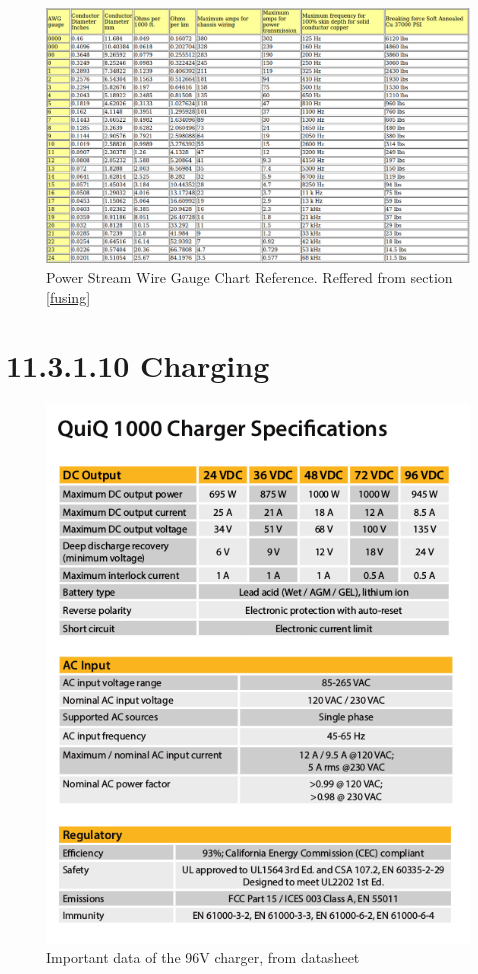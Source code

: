 \documentclass{article}
\begin{document}
\begin{figure}
    \centering
    \includegraphics[width = 1 \textwidth]{WireGaugeChart}
    \caption{Power Stream Wire Gauge Chart Reference. Reffered from section \ref{fusing}}
    \label{AWGchart}
\end{figure}

\section*{11.3.1.10 Charging}

\begin{figure}[H]
    \centering
    \includegraphics[width = 0.8 \textwidth]{chargerdata}
    \caption{Important data of the 96V charger, from datasheet}
    \label{chargerdatasheet}
\end{figure}
\end{document}
